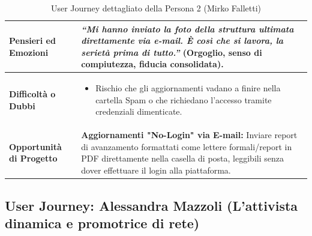 \documentclass[11pt,a4paper]{article}
\begin{document}
\begin{table}[h!]
\begin{tabular}{|p{3.2cm}|p{11.8cm}|}
\textbf{Pensieri ed Emozioni} &
\textit{``Mi hanno inviato la foto della struttura ultimata direttamente via e-mail. È così che si lavora, la serietà prima di tutto.''} (Orgoglio, senso di compiutezza, fiducia consolidata). \\ \hline
\textbf{Difficoltà o Dubbi} &
\begin{itemize}[leftmargin=*,nosep]
    \item Rischio che gli aggiornamenti vadano a finire nella cartella Spam o che richiedano l'accesso tramite credenziali dimenticate.
\end{itemize} \\ \hline
\textbf{Opportunità di Progetto} &
\textbf{Aggiornamenti "No-Login" via E-mail:} Inviare report di avanzamento formattati come lettere formali/report in PDF direttamente nella casella di posta, leggibili senza dover effettuare il login alla piattaforma. \\ \hline
\end{tabular}
\caption{User Journey dettagliato della Persona 2 (Mirko Falletti)}
\label{tab:user_journey_mirko}
\end{table}


\subsection{User Journey: Alessandra Mazzoli (L'attivista dinamica e promotrice di rete)}
\end{document}
